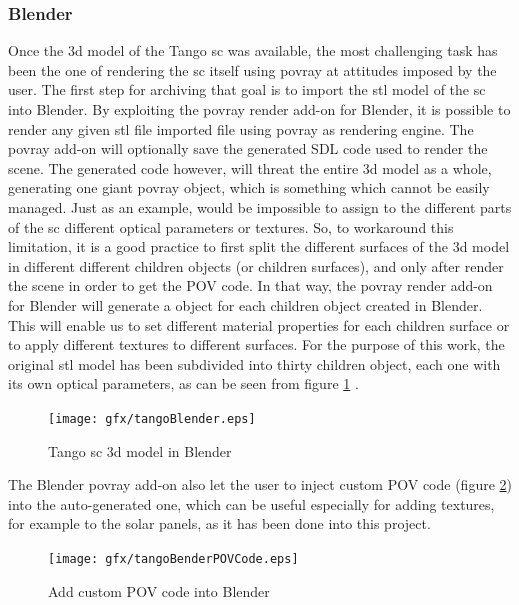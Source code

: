 \subsubsection{Blender}
Once the \acrshort{3d} model of the Tango \acrshort{sc} was available, the most challenging task has been the one of rendering the \acrshort{sc} itself using \acrshort{povray} at attitudes imposed by the user.
The first step for archiving that goal is to import the \acrshort{stl} model of the \acrshort{sc} into Blender. By exploiting the \acrshort{povray} render add-on for Blender, it is possible to render any given \acrshort{stl} file imported file using \acrshort{povray} as rendering engine. The \acrshort{povray} add-on will optionally save the generated SDL code used to render the scene.
The generated code however, will threat the entire \acrshort{3d} model as a whole, generating one giant \acrshort{povray}  object, which is something which cannot be easily managed. Just as an example, would be impossible to assign to the different parts of the \acrshort{sc} different optical parameters or textures.
So, to workaround this limitation, it is a good practice to first split the different surfaces of the \acrshort{3d} model in different different children objects (or children surfaces), and only after render the scene in order to get the POV code. In that way, the \acrshort{povray} render add-on for Blender will generate a  object for each children object created in Blender.
This will enable us to set different material properties for each children surface or to apply different textures to different surfaces.
For the purpose of this work, the original \acrshort{stl} model has been subdivided into thirty children object, each one with its own optical parameters, as can be seen from figure \ref{fig:tangoblender} .

\begin{figure}[htbp]
  \centering
  \texttt{[image: gfx/tangoBlender.eps]}
  \caption{Tango \acrshort{sc} \acrshort{3d} model in Blender}
  \label{fig:tangoblender}
\end{figure}

The Blender \acrshort{povray} add-on also let the user to inject custom POV code (figure \ref{fig:tangoblenderpov}) into the auto-generated one, which can be useful especially for adding textures, for example to the solar panels, as it has been done into this project.

\begin{figure}[htbp]
  \centering
  \texttt{[image: gfx/tangoBenderPOVCode.eps]}
  \caption{Add custom POV code into Blender}
  \label{fig:tangoblenderpov}
\end{figure}


